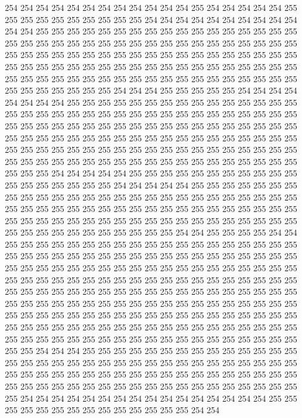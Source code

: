 254 254 254 254 254 254 254 254 254 254 254 254 255 254 254 254 254 254 255 255
255 255 255 255 255 255 255 255 254 254 254 254 254 254 254 254 254 254 254 254
255 255 255 255 255 255 255 255 255 255 255 255 255 255 255 255 255 255 255 255
255 255 255 255 255 255 255 255 255 255 255 255 255 255 255 255 255 255 255 255
255 255 255 255 255 255 255 255 255 255 255 255 255 255 255 255 255 255 255 255
255 255 255 255 255 255 255 255 255 255 255 255 255 255 255 255 255 255 255 255
255 255 255 255 255 255 255 255 255 255 255 255 255 255 255 255 255 255 255 255
254 254 254 255 255 255 255 255 254 254 254 254 254 254 254 254 255 255 255 255
255 255 255 255 255 255 255 255 255 255 255 255 255 255 255 255 255 255 255 255
255 255 255 255 255 255 255 255 255 255 255 255 255 255 255 255 255 255 255 255
255 255 255 255 255 255 255 255 255 255 255 255 255 255 255 255 255 255 255 255
255 255 255 255 255 255 255 255 255 255 255 255 255 255 255 255 255 255 255 255
255 255 255 255 255 255 255 255 255 255 255 255 255 255 255 255 255 255 255 255
255 255 255 255 255 255 255 255 255 254 254 254 254 254 255 255 255 255 255 255
255 255 255 255 255 255 255 255 255 255 255 255 254 254 254 254 254 255 255 255
255 255 255 255 255 255 255 255 255 255 255 255 255 255 255 255 255 255 255 255
255 255 255 255 255 255 255 255 255 255 255 255 255 255 255 255 255 255 255 255
255 255 255 255 255 255 255 255 255 255 255 255 255 255 255 255 255 255 255 255
255 255 255 255 255 255 255 255 255 255 255 255 254 254 255 255 255 255 254 254
255 255 255 255 255 255 255 255 255 255 255 255 255 255 255 255 255 255 255 255
255 255 255 255 255 255 255 255 255 255 255 255 255 255 255 255 255 255 255 255
255 255 255 255 255 255 255 255 255 255 255 255 255 255 255 255 255 255 255 255
255 255 255 255 255 255 255 255 255 255 255 255 255 255 255 255 255 255 255 255
255 255 255 255 255 255 255 255 255 255 255 255 255 255 255 255 255 255 255 255
255 255 255 255 255 255 255 255 255 255 255 255 255 255 255 255 255 255 255 255
255 255 255 255 255 255 255 255 255 255 255 255 255 255 255 255 255 255 255 255
255 255 255 255 255 255 255 255 255 255 255 255 255 255 255 255 255 255 255 255
255 255 255 255 255 255 255 255 255 255 255 255 255 254 254 254 255 255 255 255
255 255 255 255 255 255 255 255 255 255 255 255 255 255 255 255 255 255 255 255
255 255 255 255 255 255 255 255 255 255 255 255 255 255 255 255 255 255 255 255
255 255 255 255 255 255 255 255 255 255 255 255 255 255 255 255 255 255 255 255
255 255 255 255 255 255 255 255 254 254 254 254 254 254 254 254 254 254 254 254
254 254 254 254 255 255 255 255 255 255 255 255 255 255 255 255 255 255 254 254
